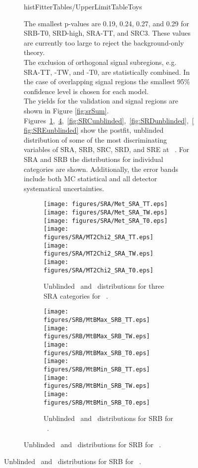 \begin{figure}[htbp]
\begin{center}
\begin{figure}[htbp]
\begin{center}
{{{ {histFitterTables/UpperLimitTableToys}


 The smallest p-values are 0.19, 0.24, 0.27, and 0.29 for SRB-T0, SRD-high, SRA-TT, and SRC3.  These values are currently too large to reject the background-only theory. \\

The exclusion of orthogonal signal subregions, e.g. SRA-TT, -TW, and -T0, are statistically combined.  In the case of overlapping signal regions the smallest 95\% confidence level is chosen for each model. \\

The yields for the validation and signal regions are shown in Figure \ref{fig:srSum}.  
Figures~\ref{fig:SRAunblinded},~\ref{fig:SRBunblinded},~\ref{fig:SRCunblinded},~\ref{fig:SRDunblinded},~\ref{fig:SREunblinded} show the postfit, unblinded distribution of some of the most discriminating variables of SRA, SRB, SRC, SRD, and SRE at \intlumi\ \ifb. For SRA and SRB the distributions for individual categories are shown. Additionally, the error bands include both MC statistical and all detector systematical uncertainties. 

\begin{figure}[!hp] 
\begin{center}
\texttt{[image: figures/SRA/Met\_SRA\_TT.eps]}
\texttt{[image: figures/SRA/Met\_SRA\_TW.eps]}
\texttt{[image: figures/SRA/Met\_SRA\_T0.eps]}
\texttt{[image: figures/SRA/MT2Chi2\_SRA\_TT.eps]}
\texttt{[image: figures/SRA/MT2Chi2\_SRA\_TW.eps]}
\texttt{[image: figures/SRA/MT2Chi2\_SRA\_T0.eps]}
\caption{Unblinded \met\ and \mttwo\ distributions for three SRA categories for \intlumi\ \ifb.}
\label{fig:SRAunblinded}
\end{center}
\end{figure}

\begin{figure}[!hp] 
\begin{center}
\texttt{[image: figures/SRB/MtBMax\_SRB\_TT.eps]}
\texttt{[image: figures/SRB/MtBMax\_SRB\_TW.eps]}
\texttt{[image: figures/SRB/MtBMax\_SRB\_T0.eps]}
\texttt{[image: figures/SRB/MtBMin\_SRB\_TT.eps]}
\texttt{[image: figures/SRB/MtBMin\_SRB\_TW.eps]}
\texttt{[image: figures/SRB/MtBMin\_SRB\_T0.eps]}
\caption{Unblinded \mtbmax\ and \mtbmin\ distributions for SRB for \intlumi\ \ifb.}
\label{fig:SRBunblinded}
\end{center}
\end{figure}



}}}
\end{center}
\end{figure}
\end{center}
\end{figure}
